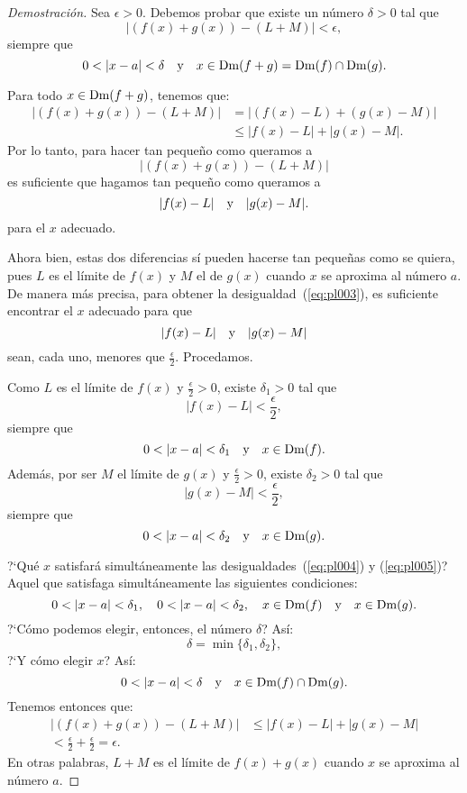 \begin{proof}[Demostración]
Sea $\epsilon > 0$. Debemos probar que existe un número
    $\delta > 0$ tal que
\begin{equation}
\label{eq:pl003}
|(f(x) + g(x)) - (L + M)| < \epsilon,
\end{equation}
siempre que
\[
0 < |x - a| < \delta\quad\text{y}\quad x\in\operatorname{Dm}(f+g) = \operatorname{Dm}(f)\cap\operatorname{Dm}(g).
\]

Para todo $x\in\operatorname{Dm}(f+g)$, tenemos que:
\begin{align*}
|(f(x) + g(x)) - (L + M)| &= |(f(x) - L) + (g(x) - M)| \\
&\leq |f(x) - L| + |g(x) - M|.
\end{align*}
Por lo tanto, para hacer tan pequeño como queramos a
\[
|(f(x) + g(x)) - (L + M)|
\]
es suficiente que hagamos tan pequeño como queramos a
\[
|f(x) - L| \quad\text{y}\quad |g(x) - M|.
\]
para el $x$ adecuado.

Ahora bien, estas dos diferencias sí pueden hacerse tan pequeñas como se quiera, pues $L$ es el
límite de $f(x)$ y $M$ el de $g(x)$ cuando $x$ se aproxima al número $a$. De manera más
precisa, para obtener la desigualdad~(\ref{eq:pl003}), es suficiente encontrar el $x$ adecuado
para que
\[
|f(x) - L| \quad\text{y}\quad |g(x) - M|
\]
sean, cada uno, menores que $\frac{\epsilon}{2}$. Procedamos.

Como $L$ es el límite de $f(x)$ y $\frac{\epsilon}{2} > 0$, existe $\delta_1 > 0$ tal que
\begin{equation}
\label{eq:pl004}
|f(x) - L| < \frac{\epsilon}{2},
\end{equation}
siempre que
\[
0 < |x - a| < \delta_1 \quad\text{y}\quad x\in\operatorname{Dm}(f).
\]
Además, por ser $M$ el límite de $g(x)$ y $\frac{\epsilon}{2} > 0$, existe $\delta_2 > 0$ tal
que
\begin{equation}
\label{eq:pl005}
|g(x) - M| < \frac{\epsilon}{2},
\end{equation}
siempre que
\[
0 < |x - a| < \delta_2 \quad\text{y}\quad x\in\operatorname{Dm}(g).
\]

?`Qué $x$ satisfará simultáneamente las desigualdades~(\ref{eq:pl004}) y (\ref{eq:pl005})? Aquel
que satisfaga simultáneamente las siguientes condiciones:
\[
0 < |x - a| < \delta_1, \quad 0 < |x - a| < \delta_2, \quad x\in\operatorname{Dm}(f)\quad\text{y}\quad x\in \operatorname{Dm}(g).
\]
?`Cómo podemos elegir, entonces, el número $\delta$? Así:
\[
\delta = \min\{\delta_1,\delta_2\},
\]
?`Y cómo elegir $x$? Así:
\[
0 < |x - a| < \delta\quad\text{y}\quad x\in\operatorname{Dm}(f)\cap \operatorname{Dm}(g).
\]
Tenemos entonces que:
\begin{align*}
|(f(x) + g(x)) - (L + M)| &\leq |f(x) - L| + |g(x) - M| \\
< \frac{\epsilon}{2} + \frac{\epsilon}{2} = \epsilon.
\end{align*}
En otras palabras, $L + M$ es el límite de $f(x) + g(x)$ cuando $x$ se aproxima al número $a$.

\end{proof}

